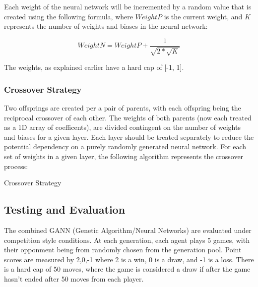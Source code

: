 \documentclass[12pt,a4paper]{article}
\makeatletter
\def\BState{\State\hskip-\ALG@thistlm}
\makeatother
\begin{document}
Each weight of the neural network will be incremented by a random value that is created using the following formula, where $WeightP$ is the current weight, and $K$ represents the number of weights and biases in the neural network:

$$ WeightN = WeightP + \frac{1}{\sqrt{2 * \sqrt{K} }}$$

The weights, as explained earlier have a hard cap of [-1, 1].

\subsubsection{Crossover Strategy}

Two offsprings are created per a pair of parents, with each offspring being the reciprocal crossover of each other. The weights of both parents (now each treated as a 1D array of coefficents), are divided contingent on the number of weights and biases for a given layer. Each layer should be treated separately to reduce the potential dependency on a purely randomly generated neural network. For each set of weights in a given layer, the following algorithm represents the crossover process:

\begin{algorithm}
    \caption{Crossover Strategy}\label{euclid}
\end{algorithm}

\subsection*{Testing and Evaluation}
The combined GANN (Genetic Algorithm/Neural Networks) are evaluated under competition style conditions. At each generation, each agent plays 5 games, with their opponment being from randomly chosen from the generation pool. Point scores are measured by {2,0,-1} where 2 is a win, 0 is a draw, and -1 is a loss. There is a hard cap of 50 moves, where the game is considered a draw if after the game hasn't ended after 50 moves from each player.
\end{document}
